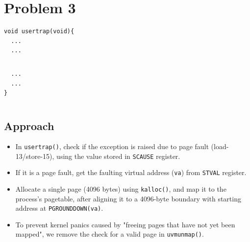 \documentclass[11pt,a4paper,english]{paper}
\newenvironment{colorboxed}[4][gray]{
\begin{tcolorbox}[colback=#1!3!white,colframe=#1(ryb)!50!black,title=\textbf{#2: #3},#4]
}{
\end{tcolorbox}
}
\begin{document}
\section{Problem 3}
\begin{colorboxed}{Code}{\texttt{kernel/trap.c::usertrap()}}{unbreakable}

    \begin{verbatim}
void usertrap(void){
  ...
  ...
    \end{verbatim}
    \vspace{-7.5mm}
    \inputminted[baselinestretch=0.85, breaklines, firstline=65, lastline=76]{c}{kernel/trap.c}
    \vspace{-8.5mm}
    \begin{verbatim}
  ...
  ...
}
    \end{verbatim}
\end{colorboxed}

\begin{colorboxed}{Code}{\texttt{kernel/vm.c::uvmunmap()}}{unbreakable}
    \inputminted[baselinestretch=0.85,firstline=148,lastline=169,breaklines]{c}{kernel/vm.c}
\end{colorboxed}

\subsection{Approach}
\begin{itemize}[nolistsep,noitemsep]
    \item In \texttt{usertrap()}, check if the exception is raised due to page fault (load-13/store-15), using the value stored in \texttt{SCAUSE} register.
    \item If it is a page fault, get the faulting virtual address (\texttt{va}) from \texttt{STVAL} register.
    \item Allocate a single page (4096 bytes) using \texttt{kalloc()}, and map it to the process's pagetable, after aligning it to a 4096-byte boundary with starting address at \texttt{PGROUNDDOWN(va)}.
    \item To prevent kernel panics caused by "freeing pages that have not yet been mapped", we remove the check for a valid page in \texttt{uvmunmap()}.

\end{itemize}


%
%
\end{document}
